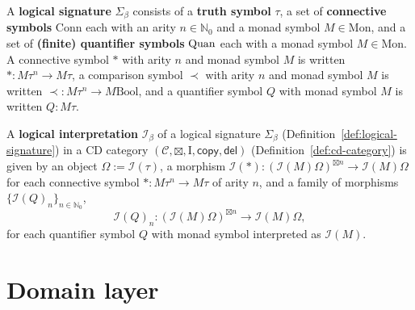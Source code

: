 \begin{definition}
\label{def:logical-signature}
\leanok
A \textbf{logical signature} $\Sigma_\beta$ consists of a \textbf{truth
symbol} $\tau$, a set of \textbf{connective symbols} $\mathrm{Conn}$
each with an arity $n \in \mathbb N_0$ and a monad symbol
$M \in \mathrm{Mon}$, and a set of \textbf{(finite) quantifier symbols}
$\mathrm{Quan}$ each with a monad symbol $M \in \mathrm{Mon}$. A connective
symbol $*$ with arity $n$ and monad symbol $M$ is written
$* \colon M\tau^n \to M\tau$, a comparison symbol $\prec$ with arity
$n$ and monad symbol $M$ is written
$\prec \colon M\tau^n \to M\mathrm{Bool}$, and a quantifier symbol $Q$
with monad symbol $M$ is written $Q \colon M\tau$.
\end{definition}

\begin{definition}
\label{def:logical-interpretation}
\leanok
A \textbf{logical interpretation} $\mathcal I_\beta$ of a logical
signature $\Sigma_\beta$ (Definition~\ref{def:logical-signature}) in a
CD category $(\mathcal C, \boxtimes, \mathrm I, \mathsf{copy}, \mathsf{del})$
(Definition~\ref{def:cd-category}) is given by an object
$\Omega := \mathcal I(\tau)$, a morphism
$\mathcal I(*) \colon (\mathcal I(M)\Omega)^{\boxtimes n} \to \mathcal I(M)\Omega$
for each connective symbol $* \colon M\tau^n \to M\tau$ of arity $n$,
and a family of morphisms $\{\mathcal I(Q)_n\}_{n \in \mathbb N_0}$,
\[
  \mathcal I(Q)_n \colon (\mathcal I(M)\Omega)^{\boxtimes n} \to \mathcal I(M)\Omega,
\]
for each quantifier symbol $Q$ with monad symbol interpreted as
$\mathcal I(M)$.
\end{definition}

\section{Domain layer}  %
\label{sec:domain-layer}

